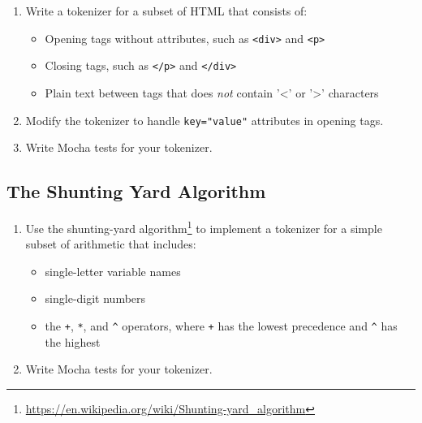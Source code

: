 \documentclass[krantzl]{krantz}
\newcommand{\hreffoot}[2]{{#1}\footnote{\href{#2}{#2}}}
\begin{document}
\begin{enumerate}

\item 

Write a tokenizer for a subset of HTML that consists of:

\begin{itemize}

\item Opening tags without attributes, such as \texttt{<div>} and \texttt{<p>}

\item Closing tags, such as \texttt{</p>} and \texttt{</div>}

\item Plain text between tags that does \emph{not} contain '<' or '>' characters

\end{itemize}



\item 

Modify the tokenizer to handle \texttt{key="value"} attributes in opening tags.



\item 

Write Mocha tests for your tokenizer.



\end{enumerate}

\subsection*{The Shunting Yard Algorithm}

\begin{enumerate}

\item 

Use the \hreffoot{shunting-yard algorithm}{https://en.wikipedia.org/wiki/Shunting-yard\_algorithm}
    to implement a tokenizer for a simple subset of arithmetic that includes:

\begin{itemize}

\item single-letter variable names

\item single-digit numbers

\item the \texttt{+}, \texttt{*}, and \texttt{{\textasciicircum}} operators, where \texttt{+} has the lowest precedence and \texttt{{\textasciicircum}} has the highest

\end{itemize}



\item 

Write Mocha tests for your tokenizer.



\end{enumerate}
\end{document}
